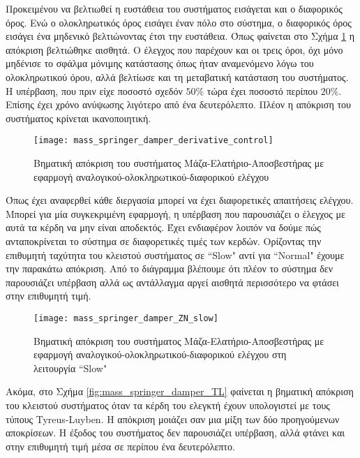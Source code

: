 Προκειμένου να βελτιωθεί η ευστάθεια του συστήματος εισάγεται και ο διαφορικός όρος. Ενώ ο ολοκληρωτικός όρος εισάγει έναν πόλο στο σύστημα, ο διαφορικός όρος εισάγει ένα μηδενικό βελτιώνοντας έτσι την ευστάθεια. Όπως φαίνεται στο Σχήμα \ref{fig:mass_springer_damper_derivative_control} η απόκριση βελτιώθηκε αισθητά. Ο έλεγχος που παρέχουν και οι τρεις όροι, όχι μόνο μηδένισε το σφάλμα μόνιμης κατάστασης όπως ήταν αναμενόμενο λόγω του ολοκληρωτικού όρου, αλλά βελτίωσε και τη μεταβατική κατάσταση του συστήματος. Η υπέρβαση, που πριν είχε ποσοστό σχεδόν $50\%$ τώρα έχει ποσοστό περίπου $20\%$. Επίσης έχει χρόνο ανύψωσης λιγότερο από ένα δευτερόλεπτο. Πλέον η απόκριση του συστήματος κρίνεται ικανοποιητική.

\begin{figure}[h]
  \centering
  \texttt{[image: mass\_springer\_damper\_derivative\_control]}
  \caption{Βηματική απόκριση του συστήματος Μάζα-Ελατήριο-Αποσβεστήρας με εφαρμογή αναλογικού-ολοκληρωτικού-διαφορικού ελέγχου}
  \label{fig:mass_springer_damper_derivative_control}
\end{figure}

Όπως έχει αναφερθεί κάθε διεργασία μπορεί να έχει διαφορετικές απαιτήσεις ελέγχου. Μπορεί για μία συγκεκριμένη εφαρμογή, η υπέρβαση που παρουσιάζει ο έλεγχος με αυτά τα κέρδη να μην είναι αποδεκτός. Έχει ενδιαφέρον λοιπόν να δούμε πώς ανταποκρίνεται το σύστημα σε διαφορετικές τιμές των κερδών. Ορίζοντας την επιθυμητή ταχύτητα του κλειστού συστήματος σε ``Slow" αντί για ``Normal" έχουμε την παρακάτω απόκριση. Από το διάγραμμα βλέπουμε ότι πλέον το σύστημα δεν παρουσιάζει υπέρβαση αλλά ως αντάλλαγμα αργεί αισθητά περισσότερο να φτάσει στην επιθυμητή τιμή.

\begin{figure}[h]
  \centering
  \texttt{[image: mass\_springer\_damper\_ZN\_slow]}
  \caption{Βηματική απόκριση του συστήματος Μάζα-Ελατήριο-Αποσβεστήρας με εφαρμογή αναλογικού-ολοκληρωτικού-διαφορικού ελέγχου στη λειτουργία ``Slow"}
  \label{fig:mass_springer_damper_ZN_slow}
\end{figure}

Ακόμα, στο Σχήμα \ref{fig:mass_springer_damper_TL} φαίνεται η βηματική απόκριση του κλειστού συστήματος όταν τα κέρδη του ελεγκτή έχουν υπολογιστεί με τους τύπους Tyreus-Luyben. Η απόκριση μοιάζει σαν μια μίξη των δύο προηγούμενων αποκρίσεων. Η έξοδος του συστήματος δεν παρουσιάζει υπέρβαση, αλλά φτάνει και στην επιθυμητή τιμή μέσα σε περίπου ένα δευτερόλεπτο.


